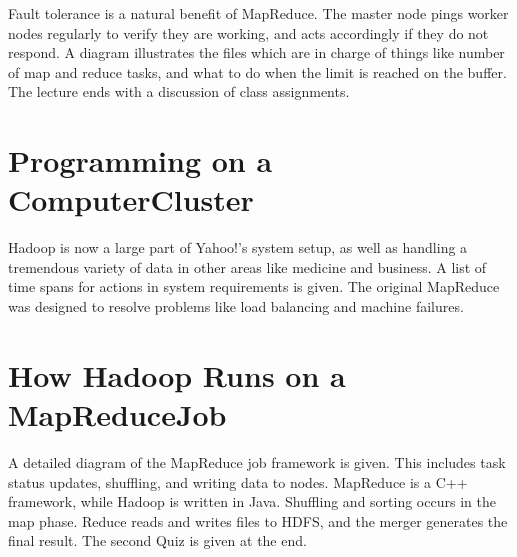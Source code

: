Fault tolerance is a natural benefit of MapReduce. The master node pings
worker nodes regularly to verify they are working, and acts accordingly
if they do not respond. A diagram illustrates the files which are in
charge of things like number of map and reduce tasks, and what to do
when the limit is reached on the buffer. The lecture ends with a
discussion of class assignments.




\section{Programming on a ComputerCluster}

Hadoop is now a large part of Yahoo!'s system setup, as well as handling
a tremendous variety of data in other areas like medicine and business.
A list of time spans for actions in system requirements is given. The
original MapReduce was designed to resolve problems like load balancing
and machine failures.




\section{How Hadoop Runs on a MapReduceJob}

A detailed diagram of the MapReduce job framework is given. This
includes task status updates, shuffling, and writing data to nodes.
MapReduce is a C++ framework, while Hadoop is written in Java. Shuffling
and sorting occurs in the map phase. Reduce reads and writes files to
HDFS, and the merger generates the final result. The second Quiz is
given at the end.


